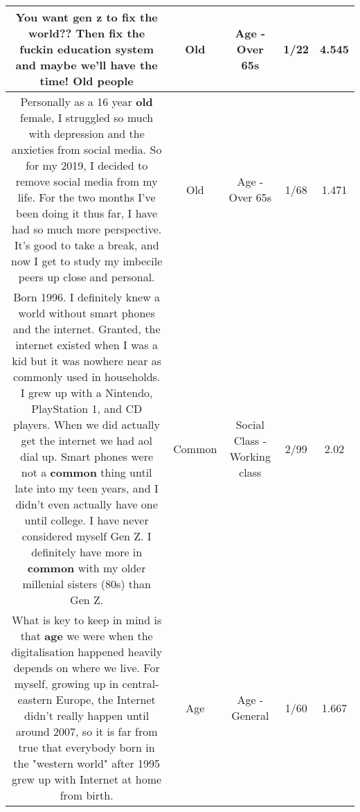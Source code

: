 \documentclass[11pt]{article}
\newlength\mylength
\begin{document}
\begin{center}
\begin{longtable}{|C{.65\mylength}|C{.30\mylength}|C{.12\mylength}|C{.12\mylength}|C{.12\mylength}|}
  \small You want gen z to fix the world?? Then fix the fuckin education system and maybe we'll have the time! \textbf{Old} people\normalsize   & Old & Age - Over 65s & 1/22 & 4.545 \\  \hline
  \small Personally as a 16 year \textbf{old} female, I struggled so much with depression and the anxieties from social media. So for my 2019, I decided to remove social media from my life. For the two months I've been doing it thus far, I have had so much more perspective. It's good to take a break, and now I get to study my imbecile peers up close and personal.\normalsize   & Old & Age - Over 65s & 1/68 & 1.471 \\  \hline
  \small Born 1996. I definitely knew a world without smart phones and the internet. Granted, the internet existed when I was a kid but it was nowhere near as commonly used in households. I grew up with a Nintendo, PlayStation 1, and CD players. When we did actually get the internet we had aol dial up. Smart phones were not a \textbf{common} thing until late into my teen years, and I didn't even actually have one until college. I have never considered myself Gen Z. I definitely have more in \textbf{common} with my older millenial sisters (80s) than Gen Z.\normalsize   & Common & Social Class - Working class & 2/99 & 2.02 \\  \hline
  \small What is key to keep in mind is that \textbf{age} we were when the digitalisation happened heavily depends on where we live. For myself, growing up in central-eastern Europe, the Internet didn't really happen until around 2007, so it is far from true that everybody born in the "western world" after 1995 grew up with Internet at home from birth.\normalsize   & Age & Age - General & 1/60 & 1.667 \\  \hline

\end{longtable}
\end{center}
\end{document}
